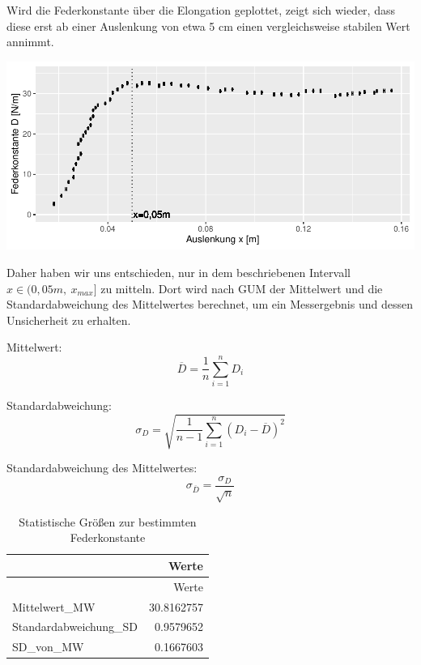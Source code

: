 \documentclass[
  9pt,
]{article}
\begin{document}
Wird die Federkonstante über die Elongation geplottet, zeigt sich
wieder, dass diese erst ab einer Auslenkung von etwa 5 cm einen
vergleichsweise stabilen Wert annimmt.

\begin{center}\includegraphics{DehnbareStoffe_files/figure-latex/unnamed-chunk-9-1} \end{center}

Daher haben wir uns entschieden, nur in dem beschriebenen Intervall
\(x \in (0,05m,\ x_{max}]\) zu mitteln. Dort wird nach GUM der
Mittelwert und die Standardabweichung des Mittelwertes berechnet, um ein
Messergebnis und dessen Unsicherheit zu erhalten.

Mittelwert: \begin{equation}\label{Mittelwert}
\overline{D} = \frac{1}{n}\sum \limits_{i=1}^nD_i
\end{equation}

Standardabweichung: \begin{equation}\label{Standardabweichung}
\sigma_D = \sqrt{\frac{1}{n-1} \sum_{i=1}^n (D_i - \overline{D})^2}
\end{equation}

Standardabweichung des Mittelwertes:
\begin{equation}\label{StandardabweichungDesMittelwertes}
\sigma_{\overline{D}}=\frac{\sigma_D}{\sqrt{n}}
\end{equation}

\begin{longtable}[]{@{}lr@{}}
\caption{Statistische Größen zur bestimmten
Federkonstante}\tabularnewline
\toprule()
& Werte \\
\midrule()
\endfirsthead
\toprule()
& Werte \\
\midrule()
\endhead
Mittelwert\_MW & 30.8162757 \\
Standardabweichung\_SD & 0.9579652 \\
SD\_von\_MW & 0.1667603 \\
\bottomrule()
\end{longtable}
\end{document}
